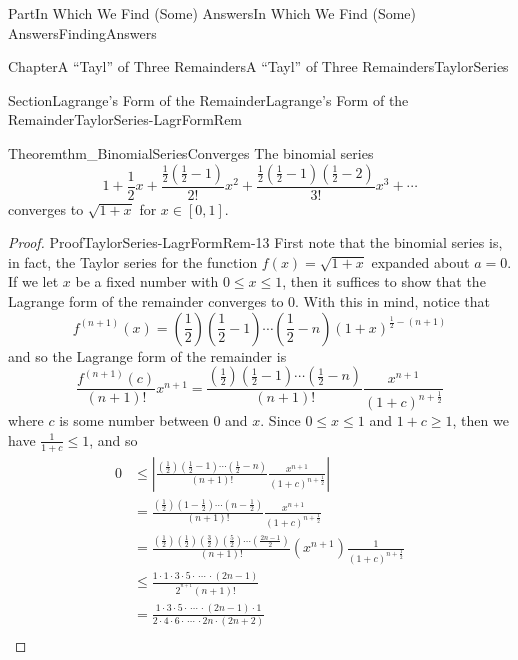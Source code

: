 \documentclass[oneside,10pt,]{book}
\numberwithin{equation}{part}
\newcommand{\amp}{&}
\begin{document}
\begin{partptx}{Part}{In Which We Find (Some) Answers}{}{In Which We Find (Some) Answers}{}{}{FindingAnswers}
\begin{chapterptx}{Chapter}{A ``Tayl'' of Three Remainders}{}{A ``Tayl'' of Three Remainders}{}{}{TaylorSeries}
\begin{sectionptx}{Section}{Lagrange's Form of the Remainder}{}{Lagrange's Form of the Remainder}{}{}{TaylorSeries-LagrFormRem}
\begin{theorem}{Theorem}{}{}{thm_BinomialSeriesConverges}
%
%
The binomial series%
\begin{equation*}
1+\frac{1}{2}x+\frac{\frac{1}{2}\left(\frac{1}{2}-1\right)}{2!}x^2+\frac{\frac{1}{2}\left(\frac{1}{2}-1\right)\left(\frac{1}{2}-2\right)}{3!}x^3+\cdots
\end{equation*}
converges to \(\sqrt{1+x}\) for \(x\in[0,1]\).%
\end{theorem}
\begin{proof}{Proof}{}{TaylorSeries-LagrFormRem-13}
First note that the binomial series is, in fact, the Taylor series for the function \(f(x)=\sqrt{1+x}\) expanded about \(a=0\). If we let \(x\) be a fixed number with \(0\leq x\leq 1\), then it suffices to show that the Lagrange form of the remainder converges to \(0\). With this in mind, notice that%
\begin{equation*}
f^{(n+1)}(x)=\left(\frac{1}{2}\right)\left(\frac{1}{2}-1\right)\cdots\left(\frac{1}{2}-n\right)\left(1+x\right)^{\frac{1}{2}-(n+1)}
\end{equation*}
and so the Lagrange form of the remainder is%
\begin{equation*}
\frac{f^{(n+1)}(c)}{(n+1)!}x^{n+1}= \frac{\left(\frac{1}{2}\right)\left(\frac{1}{2}-1\right)\cdots \left(\frac{1}{2}-n\right)}{(n+1)!}\frac{x^{n+1}}{(1+c)^{n+\frac{1}{2}}}
\end{equation*}
where \(c\) is some number between \(0\) and \(x\). Since \(0\leq x\leq 1\) and \(1+c\geq 1\), then we have \(\frac{1}{1+c}\leq 1\), and so%
\begin{align*}
0\amp \leq \left|\frac{\left(\frac{1}{2}\right)\left(\frac{1}{2}-1\right)\cdots\left(\frac{1}{2}-n\right)}{(n+1)!}\frac{x^{n+1}}{(1+c)^{n+\frac{1}{2}}}\right|\\
\amp =\frac{\left(\frac{1}{2}\right)\left(1-\frac{1}{2}\right)\cdots\left(n-\frac{1}{2}\right)}{(n+1)!}\frac{x^{n+1}}{(1+c)^{n+\frac{1}{2}}}\\
\amp =\frac{\left(\frac{1}{2}\right)\left(\frac{1}{2}\right)\left(\frac{3}{2}\right)\left(\frac{5}{2}\right)\cdots\left(\frac{2n-1}{2}\right)}{(n+1)!}\left(x^{n+1}\right)\frac{1}{(1+c)^{n+\frac{1}{2}}}\\
\amp \leq\frac{1\cdot 1\cdot 3\cdot5\cdot\,\cdots\,\cdot\left(2n-1\right)}{2^{^{n+1}}(n+1)!}\\
\amp =\frac{1\cdot 3\cdot 5\cdot\,\cdots\,\cdot\left(2n-1\right)\cdot 1}{2\cdot4\cdot 6\cdot\,\cdots\,\cdot 2n\cdot\left(2n+2\right)}\\

\end{align*}
\end{proof}
\end{sectionptx}
\end{chapterptx}
\end{partptx}
\end{document}

